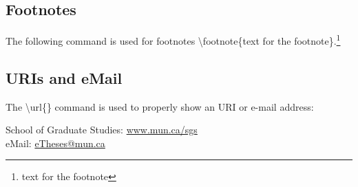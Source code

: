 \documentclass[12pt]{cls}
\begin{document}
\subsection{Footnotes}
The following command is used for footnotes \textbackslash footnote\{text for the footnote\}.\footnote{text for the footnote}

\subsection{URIs and eMail}
The \textbackslash url\{\} command is used to properly show an URI or e-mail address:

School of Graduate Studies: \url{www.mun.ca/sgs}\\
eMail: \url{eTheses@mun.ca}



\cleardoublepage

 
\end{document}
